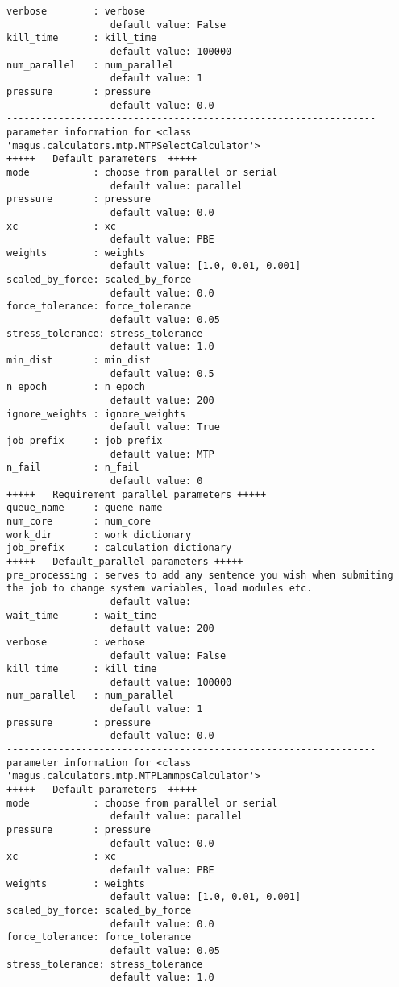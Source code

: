 \documentclass[12pt,oneside]{book}
\begin{document}
\begin{tcolorbox}
\begin{verbatim}
verbose        : verbose
                  default value: False
kill_time      : kill_time
                  default value: 100000
num_parallel   : num_parallel
                  default value: 1
pressure       : pressure
                  default value: 0.0
----------------------------------------------------------------
parameter information for <class 'magus.calculators.mtp.MTPSelectCalculator'>
+++++	Default parameters	+++++
mode           : choose from parallel or serial
                  default value: parallel
pressure       : pressure
                  default value: 0.0
xc             : xc
                  default value: PBE
weights        : weights
                  default value: [1.0, 0.01, 0.001]
scaled_by_force: scaled_by_force
                  default value: 0.0
force_tolerance: force_tolerance
                  default value: 0.05
stress_tolerance: stress_tolerance
                  default value: 1.0
min_dist       : min_dist
                  default value: 0.5
n_epoch        : n_epoch
                  default value: 200
ignore_weights : ignore_weights
                  default value: True
job_prefix     : job_prefix
                  default value: MTP
n_fail         : n_fail
                  default value: 0
+++++	Requirement_parallel parameters	+++++
queue_name     : quene name
num_core       : num_core
work_dir       : work dictionary
job_prefix     : calculation dictionary
+++++	Default_parallel parameters	+++++
pre_processing : serves to add any sentence you wish when submiting the job to change system variables, load modules etc.
                  default value: 
wait_time      : wait_time
                  default value: 200
verbose        : verbose
                  default value: False
kill_time      : kill_time
                  default value: 100000
num_parallel   : num_parallel
                  default value: 1
pressure       : pressure
                  default value: 0.0
----------------------------------------------------------------
parameter information for <class 'magus.calculators.mtp.MTPLammpsCalculator'>
+++++	Default parameters	+++++
mode           : choose from parallel or serial
                  default value: parallel
pressure       : pressure
                  default value: 0.0
xc             : xc
                  default value: PBE
weights        : weights
                  default value: [1.0, 0.01, 0.001]
scaled_by_force: scaled_by_force
                  default value: 0.0
force_tolerance: force_tolerance
                  default value: 0.05
stress_tolerance: stress_tolerance
                  default value: 1.0

\end{verbatim}
\end{tcolorbox}
\end{document}
